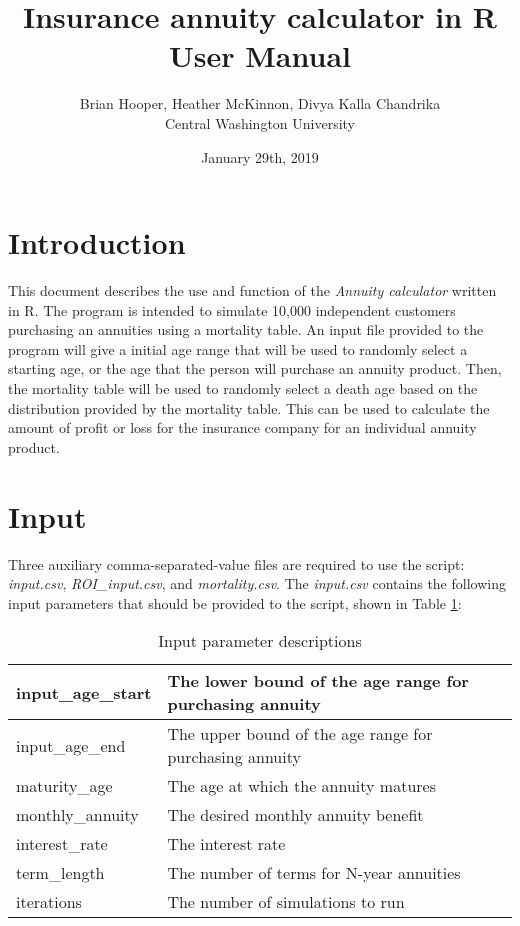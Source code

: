 \documentclass[12pt]{article}
\title{\textbf{Insurance annuity calculator in R} \\ User Manual}
\author{Brian Hooper, Heather McKinnon, Divya Kalla Chandrika  \\ Central Washington University}
\date{January 29th, 2019}
\begin{document}
	\maketitle
	
	\section{Introduction}
	This document describes the use and function of the \textit{Annuity calculator} written in R. The program is intended to simulate 10,000 independent customers purchasing an annuities using a mortality table. An input file provided to the program will give a initial age range that will be used to randomly select a starting age, or the age that the person will purchase an annuity product. Then, the mortality table will be used to randomly select a death age based on the distribution provided by the mortality table. This can be used to calculate the amount of profit or loss for the insurance company for an individual annuity product.
	
	\section{Input}
	Three auxiliary comma-separated-value files are required to use the script: \textit{input.csv}, \textit{ROI\_input.csv}, and \textit{mortality.csv}. The \textit{input.csv} contains the following input parameters that should be provided to the script, shown in Table \ref{tbl:description}: 
\begin{table}[H]
	\centering
	\begin{tabular}{|l|l|}
		\hline
		input\_age\_start & The lower bound of the age range for purchasing annuity \\ \hline
		input\_age\_end & The upper bound of the age range for purchasing annuity \\ \hline
		maturity\_age & The age at which the annuity matures \\ \hline
		monthly\_annuity & The desired monthly annuity benefit \\ \hline
		interest\_rate & The interest rate \\ \hline
		term\_length & The number of terms for N-year annuities \\ \hline
		iterations & The number of simulations to run \\ \hline
	\end{tabular}
	\caption{Input parameter descriptions}
	\label{tbl:description}
\end{table}
\end{document}
